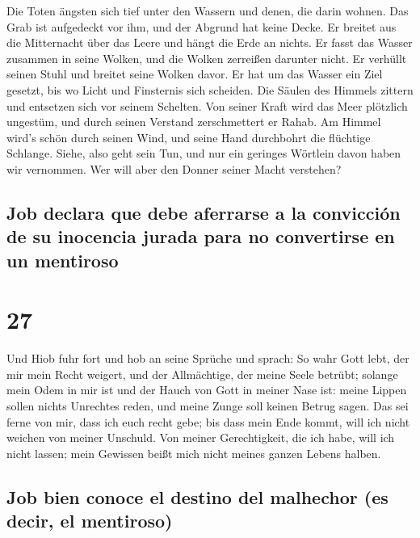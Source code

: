  Die Toten ängsten sich tief unter den Wassern und denen,
die darin wohnen.  Das Grab ist aufgedeckt vor ihm, und
der Abgrund hat keine Decke.  Er breitet aus die
Mitternacht über das Leere und hängt die Erde an nichts. 
Er fasst das Wasser zusammen in seine Wolken, und die Wolken zerreißen
darunter nicht.  Er verhüllt seinen Stuhl und breitet
seine Wolken davor.  Er hat um das Wasser ein Ziel
gesetzt, bis wo Licht und Finsternis sich scheiden.  Die
Säulen des Himmels zittern und entsetzen sich vor seinem Schelten.
 Von seiner Kraft wird das Meer plötzlich ungestüm, und
durch seinen Verstand zerschmettert er Rahab.  Am Himmel
wird's schön durch seinen Wind, und seine Hand durchbohrt die flüchtige
Schlange.  Siehe, also geht sein Tun, und nur ein
geringes Wörtlein davon haben wir vernommen. Wer will aber den Donner
seiner Macht verstehen?

\hypertarget{job-declara-que-debe-aferrarse-a-la-convicciuxf3n-de-su-inocencia-jurada-para-no-convertirse-en-un-mentiroso}{%
\subsection{Job declara que debe aferrarse a la convicción de su
inocencia jurada para no convertirse en un
mentiroso}\label{job-declara-que-debe-aferrarse-a-la-convicciuxf3n-de-su-inocencia-jurada-para-no-convertirse-en-un-mentiroso}}

\hypertarget{section-26}{%
\section{27}\label{section-26}}

 Und Hiob fuhr fort und hob an seine Sprüche und sprach:
 So wahr Gott lebt, der mir mein Recht weigert, und der
Allmächtige, der meine Seele betrübt;  solange mein Odem
in mir ist und der Hauch von Gott in meiner Nase ist: 
meine Lippen sollen nichts Unrechtes reden, und meine Zunge soll keinen
Betrug sagen.  Das sei ferne von mir, dass ich euch recht
gebe; bis dass mein Ende kommt, will ich nicht weichen von meiner
Unschuld.  Von meiner Gerechtigkeit, die ich habe, will
ich nicht lassen; mein Gewissen beißt mich nicht meines ganzen Lebens
halben.

\hypertarget{job-bien-conoce-el-destino-del-malhechor-es-decir-el-mentiroso}{%
\subsection{Job bien conoce el destino del malhechor (es decir, el
mentiroso)}\label{job-bien-conoce-el-destino-del-malhechor-es-decir-el-mentiroso}}

